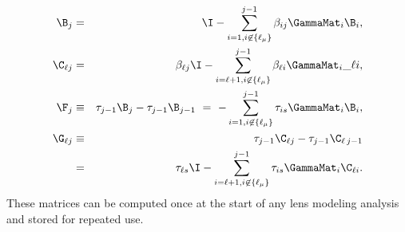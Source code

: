 \begin{eqnarray}
\B_j &=& \I - \sum\limits_{i=1,i\not \in \{\ell_\mu\}}^{j-1}\beta_{ij}\GammaMat_i \B_i, \\
\C_{\ell j} &=& \beta_{\ell j} \I - \sum\limits_{i=\ell+1, i\not\in\{\ell_\mu\}}^{j-1} \beta_{\ell i}\GammaMat_i\_{\ell i}, \label{eqn:cmatdef}\\
\F_j &\equiv& \tau_{j-1} \B_{j}-\tau_{j-1} \B_{j-1}
  \ =\ - \sum\limits_{i=1,i\not \in \{\ell_\mu\}}^{j-1} \tau_{is}\GammaMat_i\B_i, \\
\G_{\ell j}&\equiv& \tau_{j-1} \C_{\ell j}-\tau_{j-1} \C_{\ell \,j-1}
  \nonumber \\
 &=&\ \tau_{\ell s}\I- \sum\limits_{i=\ell+1,i \not \in \{\ell_\mu\}}^{j-1} \tau_{is}\GammaMat_i\C_{\ell i}.
\end{eqnarray}
These matrices can be computed once at the start of any lens modeling analysis and stored for repeated use.
  
  
  
  
  
  